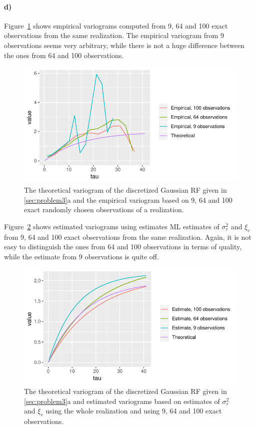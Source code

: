 \paragraph{d)}
Figure~\ref{fig:3d_variogram_obss} shows empirical variograms computed from 9, 64 and 100 exact observations from the same realization. The empirical variogram from 9 observations seems very arbitrary, while there is not a huge difference between the ones from 64 and 100 observations.

\begin{figure}
    \centering
    \includegraphics[scale=0.95]{figures/3d_variogram_obss.pdf}
    \caption{The theoretical variogram of the discretized Gaussian RF given in \ref{sec:problem3}a and the empirical variogram based on 9, 64 and 100 exact randomly chosen observations of a realization.}
    \label{fig:3d_variogram_obss}
\end{figure}

Figure~\ref{fig:3d_variogram_estimatess} shows estimated variograms using estimates ML estimates of $\sigma_r^2$ and $\xi_r$ from 9, 64 and 100 exact observations from the same realization. Again, it is not easy to distinguish the ones from 64 and 100 observations in terms of quality, while the estimate from 9 observations is quite off.

\begin{figure}
    \centering
    \includegraphics[scale=0.95]{figures/3d_variogram_estimatess.pdf}
    \caption{The theoretical variogram of the discretized Gaussian RF given in \ref{sec:problem3}a and estimated variograms based on estimates of $\sigma_r^2$ and $\xi_r$ using the whole realization and using 9, 64 and 100 exact observations.}
    \label{fig:3d_variogram_estimatess}
\end{figure}

